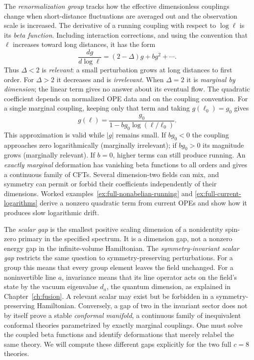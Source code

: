 The \emph{renormalization group} tracks how the effective
dimensionless couplings change when short-distance fluctuations are
averaged out and the observation scale is increased. The derivative
of a running coupling with respect to $\log\ell$ is its
\emph{beta function}. Including interaction corrections, and using
the convention that $\ell$ increases toward long distances, it has
the form
\[
 \frac{dg}{d\log\ell}
 =(2-\Delta)g+b g^2+\cdots.
\]
Thus $\Delta<2$ is \emph{relevant}: a small perturbation grows
at long distances to first order. For $\Delta>2$ it decreases and
is \emph{irrelevant}. When $\Delta=2$ it is \emph{marginal by
dimension}; the linear term gives no answer about its eventual flow.
The quadratic coefficient depends on normalized OPE data and on the
coupling convention. For a single marginal coupling, keeping only
that term and taking $g(\ell_0)=g_0$ gives
\[
 g(\ell)=\frac{g_0}{1-bg_0\log(\ell/\ell_0)}.
\]
This approximation is valid while $|g|$ remains small. If $bg_0<0$
the coupling approaches zero logarithmically (marginally irrelevant);
if $bg_0>0$ its magnitude grows (marginally relevant). If $b=0$,
higher terms can still produce running. An \emph{exactly marginal}
deformation has vanishing beta functions to all orders and gives
a continuous family of CFTs. Several dimension-two fields can mix, and
symmetry can permit or forbid their coefficients independently of
their dimensions.
Worked examples~\ref{ex:full-nonabelian-running} and
\ref{ex:full-current-logarithms} derive a nonzero quadratic term
from current OPEs and show how it produces slow logarithmic drift.

The \emph{scalar gap} is the smallest positive scaling dimension
of a nonidentity spin-zero primary in the specified spectrum. It is
a dimension gap, not a nonzero energy gap in the infinite-volume
Hamiltonian. The \emph{symmetry-invariant scalar gap} restricts the
same question to symmetry-preserving perturbations. For a group this
means that every group element leaves the field unchanged. For a
noninvertible line $a$, invariance means that its line operator acts
on the field's state by the vacuum eigenvalue $d_a$, the quantum
dimension, as explained in Chapter~\ref{ch:fusion}.
A relevant
scalar may exist but be forbidden in a symmetry-preserving
Hamiltonian. Conversely, a gap of two in the invariant sector does
not by itself prove a stable \emph{conformal manifold}, a continuous
family of inequivalent conformal theories parametrized by exactly
marginal couplings. One must solve the coupled beta functions and
identify deformations that merely relabel the same theory. We will compute
these different gaps explicitly for the two full $c=8$ theories.

